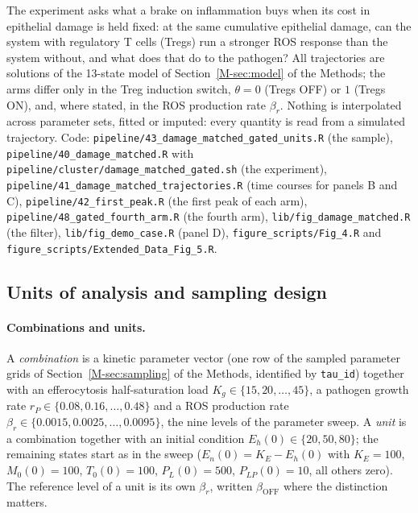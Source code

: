 \documentclass[11pt]{article}
\begin{document}
The experiment asks what a brake on inflammation buys when its cost in epithelial damage is
held fixed: at the same cumulative epithelial damage, can the system with regulatory T cells
(Tregs) run a stronger ROS response than the system without, and what does that do to the
pathogen? All trajectories are solutions of the 13-state model of Section~\ref{M-sec:model} of the Methods; the
arms differ only in the Treg induction switch, $\theta = 0$ (Tregs OFF) or $1$
(Tregs ON), and, where stated, in the ROS production rate $\beta_r$. Nothing is interpolated
across parameter sets, fitted or imputed: every quantity is read from a simulated trajectory.
Code: \texttt{pipeline/43\_damage\_matched\_gated\_units.R} (the sample),
\texttt{pipeline/40\_damage\_matched.R} with \texttt{pipeline/cluster/damage\_matched\_gated.sh}
(the experiment), \texttt{pipeline/41\_damage\_matched\_trajectories.R} (time courses for
panels B and C), \texttt{pipeline/42\_first\_peak.R} (the first peak of each arm),
\texttt{pipeline/48\_gated\_fourth\_arm.R} (the fourth arm),
\texttt{lib/fig\_damage\_matched.R} (the filter), \texttt{lib/fig\_demo\_case.R} (panel D),
\texttt{figure\_scripts/Fig\_4.R} and \texttt{figure\_scripts/Extended\_Data\_Fig\_5.R}.

\subsection{Units of analysis and sampling design}

\paragraph{Combinations and units.} A \emph{combination} is a kinetic parameter vector (one
row of the sampled parameter grids of Section~\ref{M-sec:sampling} of the Methods, identified by \texttt{tau\_id})
together with an efferocytosis half-saturation load $K_g \in \{15, 20, \dots, 45\}$, a
pathogen growth rate $r_P \in \{0.08, 0.16, \dots, 0.48\}$ and a
ROS production rate $\beta_r \in \{0.0015, 0.0025, \dots, 0.0095\}$, the nine levels of the
parameter sweep. A \emph{unit} is a combination together with an initial condition
$E_h(0) \in \{20, 50, 80\}$; the remaining states start as in the sweep
($E_n(0) = K_E - E_h(0)$ with $K_E = 100$, $M_0(0) = 100$, $T_0(0) = 100$, $P_L(0) = 500$,
$P_{LP}(0) = 10$, all others zero). The reference level of a unit is its own $\beta_r$, written
$\beta_{\mathrm{OFF}}$ where the distinction matters.
\end{document}
